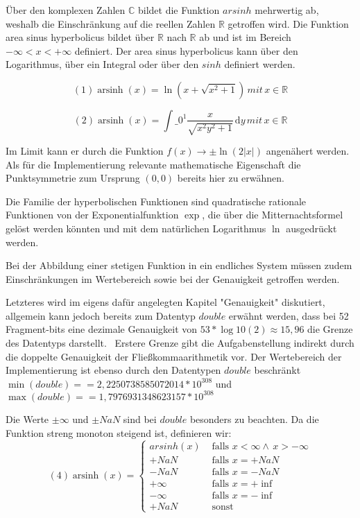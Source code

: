 \documentclass[course=erap] {aspdoc}
\begin{document}
    Über den komplexen Zahlen $\mathbb{C}$ bildet die Funktion $arsinh$ mehrwertig ab, weshalb die Einschränkung auf die reellen Zahlen $\mathbb{R}$ getroffen wird.
    Die Funktion area sinus hyperbolicus bildet über $\mathbb{R}$ nach $\mathbb{R}$ ab und ist im Bereich $-\infty < x < + \infty$ definiert.
    Der area sinus hyperbolicus kann über den Logarithmus, über ein Integral oder über den $sinh$ definiert werden.

    $$ (1) \operatorname{arsinh}(x) = \ln \left(x + \sqrt{x^2 + 1} \right) \, mit \, x \in \mathbb{R}$$

    $$ (2) \operatorname{arsinh}(x) = \int\_{0}^{1} \frac{x}{\sqrt{x^2 y^2 + 1}} \,\mathrm{d}y \, mit \, x \in \mathbb{R} $$

    Im Limit kann er durch die Funktion $f(x)\to \pm \ln(2|x|)$ angenähert werden.
    Als für die Implementierung relevante mathematische Eigenschaft die Punktsymmetrie zum Ursprung $(0,0)$ bereits hier zu erwähnen.


    Die Familie der hyperbolischen Funktionen sind quadratische rationale Funktionen von der Exponentialfunktion $\exp$,
    die über die Mitternachtsformel gelöst werden könnten und mit dem natürlichen Logarithmus $\ln$ ausgedrückt werden.


    Bei der Abbildung einer stetigen Funktion in ein endliches System müssen zudem Einschränkungen im Wertebereich sowie bei der Genauigkeit getroffen werden.


    Letzteres wird im eigens dafür angelegten Kapitel "Genauigkeit" diskutiert, allgemein kann jedoch bereits zum Datentyp $double$ erwähnt werden, dass bei 52 Fragment-bits eine dezimale Genauigkeit von $53*\log10(2) \approx 15,96$ die Grenze des Datentyps darstellt.~\cite{StandardforBinaryFloating-PointArithmetic}
    Erstere Grenze gibt die Aufgabenstellung indirekt durch die doppelte Genauigkeit der Fließkommaarithmetik vor.
    Der Wertebereich der Implementierung ist ebenso durch den Datentypen $double$ beschränkt $\min(double) =  = 2,2250738585072014* 10^308$ und $\max(double) =  = 1,7976931348623157 * 10^308$


    Die Werte $\pm \infty$ und $\pm NaN$ sind bei $double$ besonders zu beachten.
    Da die Funktion streng monoton steigend ist, definieren wir:
    \[(4) \operatorname{arsinh}(x) =
    \begin{cases}
        arsinh(x)     & \text{ falls } x < \infty \wedge \, x > -\infty \\
        +NaN  & \text{ falls } x = +NaN \\
        -NaN  & \text{ falls } x = -NaN \\
        +\infty     & \text{ falls } x = +\inf \\
        -\infty     & \text{ falls } x = -\inf \\
        +NaN     & \text{ sonst }

    \end{cases}\]
\end{document}
